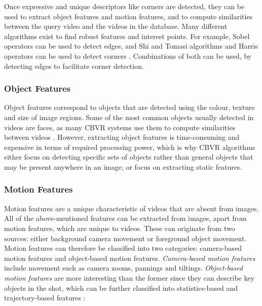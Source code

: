 Once expressive and unique descriptors like corners are detected, they can be used to extract object features and motion features, and to compute similarities between the query video and the videos in the database. Many different algorithms exist to find robust features and interest points. For example, Sobel operators can be used to detect edges, and Shi and Tomasi algorithms and Harris operators can be used to detect corners \cite{bradski2008opencv}. Combinations of both can be used, by detecting edges to facilitate corner detection.

\subsubsection{Object Features}

Object features correspond to objects that are detected using the colour, texture and size of image regions. Some of the most common objects usually detected in videos are faces, as many CBVR systems use them to compute similarities between videos \cite{sivic2005face}. However, extracting object features is time-consuming and expensive in terms of required processing power, which is why CBVR algorithms either focus on detecting specific sets of objects rather than general objects that may be present anywhere in an image; or focus on extracting static features.

\subsubsection{Motion Features}

Motion features are a unique characteristic of videos that are absent from images. All of the above-mentioned features can be extracted from images, apart from motion features, which are unique to videos. These can originate from two sources: either background camera movement or foreground object movement. Motion features can therefore be classified into two categories: camera-based motion features and object-based motion features. \textit{Camera-based motion features} include movement such as camera zooms, pannings and tiltings. \textit{Object-based motion features} are more interesting than the former since they can describe key objects in the shot, which can be further classified into statistics-based and trajectory-based features \cite{hu2011survey}:
    
